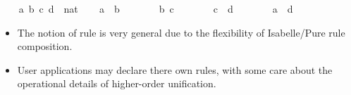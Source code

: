 \begin{isabellebody}
\isamarkuptrue%
\ \ \isamarkupfalse%
\ a\ b\ c\ d\ {}{}\ nat\isanewline
\isanewline
\ \ \isamarkupfalse%
\ {}a\ {}\ b{}\ \isamarkupfalse%
\isanewline
\ \ \isamarkupfalse%
\isanewline
\ \ \isamarkupfalse%
\ {}b{}\ c{}\ \isamarkupfalse%
\isanewline
\ \ \isamarkupfalse%
\isanewline
\ \ \isamarkupfalse%
\ {}c\ {}\ d{}\ \isamarkupfalse%
\isanewline
\ \ \isamarkupfalse%
\isanewline
\ \ \isamarkupfalse%
\ {}a\ {}\ d{}\ \isamarkupfalse%
%
\endisatagproof
{\isafoldproof}%
%
\isadelimproof
%
\endisadelimproof
\isanewline
{}\isamarkupfalse%
%
\isamarkuptrue%
%
\begin{isamarkuptext}%
\begin{itemize}

  \item The notion of  rule is very general due to the
  flexibility of Isabelle/Pure rule composition.

  \item User applications may declare there own rules, with some care
  about the operational details of higher-order unification.


\end{itemize}
\end{isamarkuptext}
\end{isabellebody}
